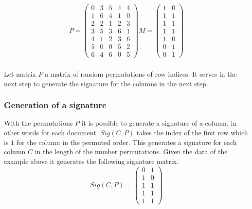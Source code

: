 \begin{equation}
    \begin{split}
        P = 
        \begin{pmatrix}
            0 & 3 & 5 & 4 & 4 \\
            1 & 6 & 4 & 1 & 0 \\
            2 & 2 & 1 & 2 & 3 \\
            3 & 5 & 3 & 6 & 1 \\
            4 & 1 & 2 & 3 & 6 \\
            5 & 0 & 0 & 5 & 2 \\
            6 & 4 & 6 & 0 & 5
        \end{pmatrix}
        M = 
        \begin{pmatrix}
            1 & 0 \\
            1 & 1 \\
            1 & 1 \\
            1 & 1 \\
            1 & 0 \\
            0 & 1 \\
            0 & 1
        \end{pmatrix}   
    \end{split}
\end{equation} \\

Let matrix $ P $ a matrix of random permutations of row indices. It serves in the next step to generate the signature for the columns in the next step.\\

\subsubsection{Generation of a signature}

With the permutations $ P $ it is possible to generate a signature of a column, in other words for each document. $ Sig(C, P) $ takes the index of the first row which is $ 1 $ for the column in the permuted order. This generates a signature for each column $ C $ in the length of the number permutations. Given the data of the example above it generates the following signature matrix. \\

\begin{equation}
    Sig(C, P) = 
    \begin{pmatrix}
        0 & 1 \\
        1 & 0 \\
        1 & 1 \\
        1 & 1 \\
        1 & 1
    \end{pmatrix}
\end{equation} \\

